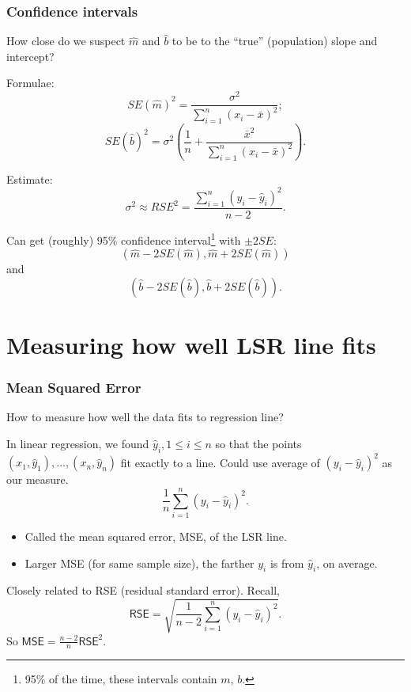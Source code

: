\documentclass{beamer}
\theoremstyle{example}
\begin{document}
\begin{frame}
    \frametitle{Confidence intervals}
    How close do we suspect $\hat{m}$ and $\hat{b}$ to be to the ``true'' (population) slope and intercept?
    
    Formulae: 
    \[SE(\hat{m})^2 = \frac{\sigma^2}{\sum_{i=1}^n(x_i - \bar{x})^2};\]
    \[SE(\hat{b})^2 = \sigma^2\left(\frac1{n} + \frac{\bar{x}^2}{\sum_{i=1}^n(x_i - \bar{x})^2}\right).\]
    
    Estimate:
        \[\sigma^2 \approx RSE^2 = \frac{\sum_{i=1}^n(y_i - \hat{y}_i)^2}{n-2}.\]
    
        \pause
    Can get (roughly) 95\% confidence interval\footnote{95\% of the time, these intervals contain $m$, $b$.} with $\pm 2SE$: 
        \[(\hat{m} - 2SE(\hat{m}), \hat{m} + 2SE(\hat{m}))\]
    and 
        \[(\hat{b} - 2SE(\hat{b}), \hat{b} + 2SE(\hat{b})).\]
    
\end{frame}

\section{Measuring how well LSR line fits}

\begin{frame}
\frametitle{Mean Squared Error}
How to measure how well the data fits to regression line?

\pause 
In linear regression, we found $\hat{y}_i, 1\le i\le n$ so that the points $(x_1,\hat{y}_1), \ldots, (x_n, \hat{y}_n)$ fit exactly to a line. Could use average of $(y_i - \hat{y}_i)^2$ as our measure.
    \[ \frac{1}{n}\sum_{i=1}^n (y_i - \hat{y}_i)^2. \]
\pause
\begin{itemize}
    \item Called the mean squared error, MSE, of the LSR line.
    \item Larger MSE (for same sample size), the farther $y_i$ is from $\hat{y}_i$, on average.
\end{itemize}

\pause
Closely related to RSE (residual standard error). Recall, 
    \[\textsf{RSE} = \sqrt{\frac{1}{n-2}\sum_{i=1}^n(y_i - \hat{y}_i)^2}.\]
So $\textsf{MSE} = \frac{n-2}{n}\textsf{RSE}^2$.
\end{frame}
\end{document}
